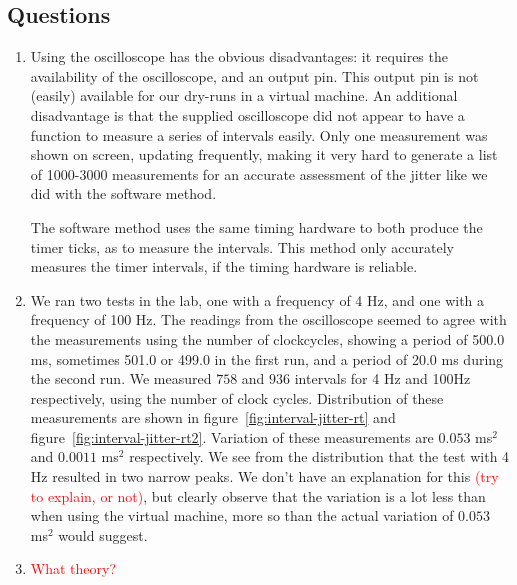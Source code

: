 \documentclass[a4paper,twoside,11pt]{article}
\newcommand{\todo}[1]{{\Large\sc\textcolor{red}{#1}}}
\begin{document}
\subsection{Questions}
\begin{enumerate}
 \item Using the oscilloscope has the obvious disadvantages: it requires the availability of the oscilloscope, and an output pin. This output pin is not (easily) available for our dry-runs in a virtual machine. An additional disadvantage is that the supplied oscilloscope did not appear to have a function to measure a series of intervals easily. Only one measurement was shown on screen, updating frequently, making it very hard to generate a list of 1000-3000 measurements for an accurate assessment of the jitter like we did with the software method.
 
 The software method uses the same timing hardware to both produce the timer ticks, as to measure the intervals. This method only accurately measures the timer intervals, if the timing hardware is reliable.
 \item We ran two tests in the lab, one with a frequency of 4 Hz, and one with a frequency of 100 Hz. The readings from the oscilloscope seemed to agree with the measurements using the number of clockcycles, showing a period of 500.0 ms, sometimes 501.0 or 499.0 in the first run, and a period of 20.0 ms during the second run. We measured $758$ and $936$ intervals for 4 Hz and 100Hz respectively, using the number of clock cycles. Distribution of these measurements are shown in figure~\ref{fig:interval-jitter-rt} and figure~\ref{fig:interval-jitter-rt2}. Variation of these measurements are $0.053$ ms$^2$ and $0.0011$ ms$^2$ respectively. We see from the distribution that the test with 4 Hz resulted in two narrow peaks. We don't have an explanation for this \todo{(try to explain, or not)}, but clearly observe that the variation is a lot less than when using the virtual machine, more so than the actual variation of $0.053$ ms$^2$ would suggest.
 
 \item \todo{What theory?}
\end{enumerate}
\end{document}
